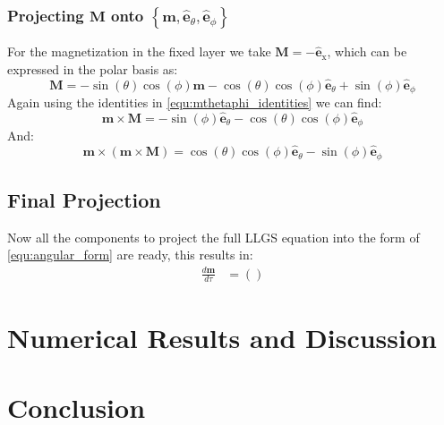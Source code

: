 \documentclass[reprint,amsmath,amssymb,aps, floatfix]{revtex4-2}
\begin{document}
\subsubsection{Projecting $\mathbf{M}$ onto $\left\{\mathbf{m}, \hat{\mathbf{e}}_{\theta}, \hat{\mathbf{e}}_{\phi}\right\}$}
For the magnetization in the fixed layer we take $\mathbf{M}=-\hat{\mathbf{e}}_{\text{x}}$, which can be expressed in the polar basis as:
\begin{equation}
    \mathbf{M} = -\sin(\theta)\cos(\phi)\mathbf{m} -\cos(\theta)\cos(\phi)\hat{\mathbf{e}}_{\theta} + \sin(\phi)\hat{\mathbf{e}}_{\phi}
\end{equation}
Again using the identities in \autoref{equ:mthetaphi_identities} we can find:
\begin{equation}
    \mathbf{m}\times\mathbf{M} = -\sin(\phi)\hat{\mathbf{e}}_{\theta} - \cos(\theta)\cos(\phi)\hat{\mathbf{e}}_{\phi}
\end{equation}
And:
\begin{equation}
    \mathbf{m}\times\left(\mathbf{m}\times\mathbf{M}\right) = \cos(\theta)\cos(\phi)\hat{\mathbf{e}}_{\theta} - \sin(\phi)\hat{\mathbf{e}}_{\phi}
\end{equation}

\subsection{Final Projection}
Now all the components to project the full LLGS equation into the form of \autoref{equ:angular_form} are ready, this results in:
\begin{equation}
    \begin{aligned}
        \frac{d\mathbf{m}}{d\tau} & = \left(\right)
    \end{aligned}
\end{equation}

\section{Numerical Results and Discussion}

\section{Conclusion}
\end{document}
